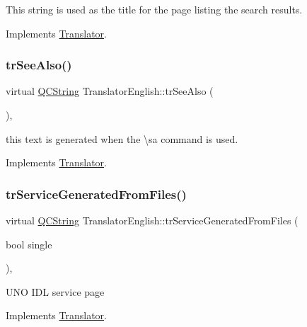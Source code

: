 This string is used as the title for the page listing the search results. 

Implements \mbox{\hyperlink{class_translator}{Translator}}.

\mbox{\label{class_translator_english_a854604f89d4df2753614dc1b1d4bbd9b}} 
\subsubsection{\texorpdfstring{trSeeAlso()}{trSeeAlso()}}
{\footnotesize\ttfamily virtual \mbox{\hyperlink{class_q_c_string}{Q\+C\+String}} Translator\+English\+::tr\+See\+Also (\begin{DoxyParamCaption}{ }\end{DoxyParamCaption})\hspace{0.3cm}{\ttfamily [inline]}, {\ttfamily [virtual]}}

this text is generated when the \textbackslash{}sa command is used. 

Implements \mbox{\hyperlink{class_translator}{Translator}}.

\mbox{\label{class_translator_english_a337e0ced64f3b90a78ac71a8c0929a6e}} 
\subsubsection{\texorpdfstring{trServiceGeneratedFromFiles()}{trServiceGeneratedFromFiles()}}
{\footnotesize\ttfamily virtual \mbox{\hyperlink{class_q_c_string}{Q\+C\+String}} Translator\+English\+::tr\+Service\+Generated\+From\+Files (\begin{DoxyParamCaption}\item[{bool}]{single }\end{DoxyParamCaption})\hspace{0.3cm}{\ttfamily [inline]}, {\ttfamily [virtual]}}

U\+NO I\+DL service page 

Implements \mbox{\hyperlink{class_translator}{Translator}}.

\mbox{\label{class_translator_english_a044df870524c280750c8e57b2d85a465}} 
